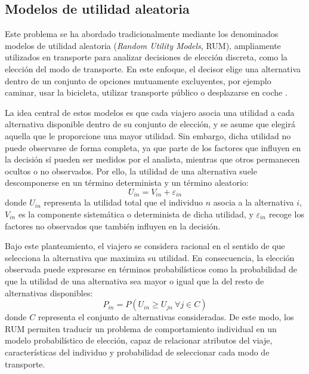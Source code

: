 \subsection{Modelos de utilidad aleatoria}

Este problema se ha abordado tradicionalmente mediante los denominados modelos de utilidad aleatoria (\textit{Random Utility Models}, RUM), ampliamente utilizados en transporte para analizar decisiones de elección discreta, como la elección del modo de transporte. En este enfoque, el decisor elige una alternativa dentro de un conjunto de opciones mutuamente excluyentes, por ejemplo caminar, usar la bicicleta, utilizar transporte público o desplazarse en coche \cite{Train2009,McFadden1974}.

La idea central de estos modelos es que cada viajero asocia una utilidad a cada alternativa disponible dentro de su conjunto de elección, y se asume que elegirá aquella que le proporcione una mayor utilidad. Sin embargo, dicha utilidad no puede observarse de forma completa, ya que parte de los factores que influyen en la decisión sí pueden ser medidos por el analista, mientras que otros permanecen ocultos o no observados. Por ello, la utilidad de una alternativa suele descomponerse en un término determinista y un término aleatorio:
\begin{equation}
U_{in} = V_{in} + \varepsilon_{in}
\end{equation}
donde $U_{in}$ representa la utilidad total que el individuo $n$ asocia a la alternativa $i$, $V_{in}$ es la componente sistemática o determinista de dicha utilidad, y $\varepsilon_{in}$ recoge los factores no observados que también influyen en la decisión.

Bajo este planteamiento, el viajero se considera racional en el sentido de que selecciona la alternativa que maximiza su utilidad. En consecuencia, la elección observada puede expresarse en términos probabilísticos como la probabilidad de que la utilidad de una alternativa sea mayor o igual que la del resto de alternativas disponibles:
\begin{equation}
P_{in} = P(U_{in} \geq U_{jn}\ \forall j \in C)
\end{equation}
donde $C$ representa el conjunto de alternativas consideradas. De este modo, los RUM permiten traducir un problema de comportamiento individual en un modelo probabilístico de elección, capaz de relacionar atributos del viaje, características del individuo y probabilidad de seleccionar cada modo de transporte.

